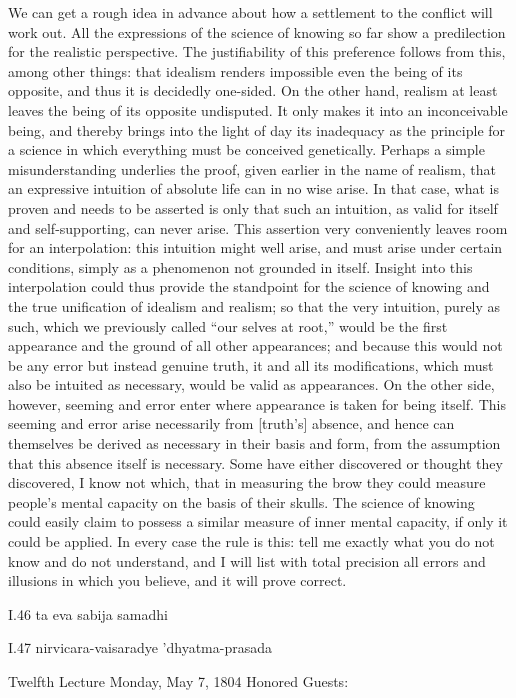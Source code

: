 We can get a rough idea in advance about
how a settlement to the conflict will work out.
All the expressions of the science of knowing so far
show a predilection for the realistic perspective.
The justifiability of this preference follows
from this, among other things:
that idealism renders impossible
even the being of its opposite,
and thus it is decidedly one-sided.
On the other hand, realism at least leaves
the being of its opposite undisputed.
It only makes it into an inconceivable being,
and thereby brings into the light of day
its inadequacy as the principle for a science
in which everything must be conceived genetically.
Perhaps a simple misunderstanding underlies the proof,
given earlier in the name of realism,
that an expressive intuition of
absolute life can in no wise arise.
In that case, what is proven
and needs to be asserted is only that
such an intuition,
as valid for itself and self-supporting,
can never arise.
This assertion very conveniently
leaves room for an interpolation:
this intuition might well arise,
and must arise under certain conditions,
simply as a phenomenon not grounded in itself.
Insight into this interpolation could thus provide
the standpoint for the science of knowing
and the true unification of idealism and realism;
so that the very intuition, purely as such,
which we previously called “our selves at root,”
would be the first appearance
and the ground of all other appearances;
and because this would not be any error
but instead genuine truth,
it and all its modifications,
which must also be intuited as necessary,
would be valid as appearances.
On the other side, however, seeming and error
enter where appearance is taken for being itself.
This seeming and error arise necessarily from [truth's] absence,
and hence can themselves be derived
as necessary in their basis and form,
from the assumption that this absence itself is necessary.
Some have either discovered or thought they discovered,
I know not which, that in measuring the brow
they could measure people's mental capacity
on the basis of their skulls.
The science of knowing could easily claim
to possess a similar measure of inner mental capacity,
if only it could be applied.
In every case the rule is this:
tell me exactly what you do not know
and do not understand,
and I will list with total precision
all errors and illusions in which you believe,
and it will prove correct.

I.46
ta eva sabija samadhi

I.47
nirvicara-vaisaradye 'dhyatma-prasada

Twelfth Lecture
Monday, May 7, 1804
Honored Guests:

